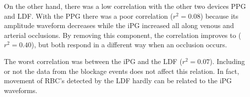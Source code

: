 On the other hand, there was a low correlation with the other two devices PPG and LDF. With the PPG there was a poor correlation ($r^2 = 0.08$) because its amplitude waveform decreases while the iPG increased all along venous and arterial occlusions.  By removing this component, the correlation improves to ($r^2 = 0.40$), but both respond in a different way when an occlusion occurs.

The worst correlation was between the iPG and the LDF ($r^2 = 0.07$). Including or not the data from the blockage events does not affect this relation. In fact, movement of RBC's detected by the LDF hardly can be related to the iPG waveforms. 


